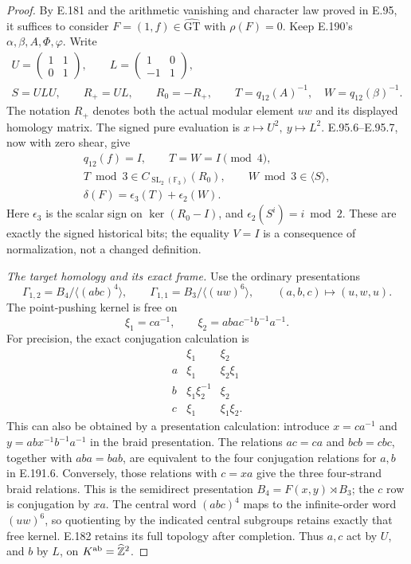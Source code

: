 \begin{proof}
By E.181 and the arithmetic vanishing and character
law proved in E.95, it suffices to consider
\(F=(1,f)\in\widehat{\mathrm{GT}}\) with \(\rho(F)=0\).
Keep E.190's \(\alpha,\beta,A,\Phi,\varphi\).  Write
\[
 \begin{gathered}
 U=\begin{pmatrix}1&1\\0&1\end{pmatrix},\qquad
 L=\begin{pmatrix}1&0\\-1&1\end{pmatrix},\\
 S=ULU,\qquad R_+=UL,\qquad R_0=-R_+,\qquad
 T=q_{12}(A)^{-1},\quad W=q_{12}(\beta)^{-1}.
 \end{gathered}
\tag{E.191.2}
\]
The notation \(R_+\) denotes both the actual modular
element \(uw\) and its displayed homology matrix.
The signed pure evaluation is
\(x\mapsto U^2,\ y\mapsto L^2\).
E.95.6--E.95.7, now with zero shear, give
\[
 \begin{gathered}
 q_{12}(f)=I,\qquad T=W=I\pmod4,\\
 T\bmod3\in C_{\operatorname{SL}_2(\mathbb F_3)}(R_0),
 \qquad W\bmod3\in\langle S\rangle,\\
 \delta(F)=\epsilon_3(T)+\epsilon_2(W).
 \end{gathered}
\tag{E.191.3}
\]
Here \(\epsilon_3\) is the scalar sign on
\(\ker(R_0-I)\), and \(\epsilon_2(S^i)=i\bmod2\).
These are exactly the signed historical bits;
the equality \(V=I\) is a consequence of normalization,
not a changed definition.

\emph{The target homology and its exact frame.}
Use the ordinary presentations
\[
 \Gamma_{1,2}=B_4/\langle(abc)^4\rangle,\qquad
 \Gamma_{1,1}=B_3/\langle(uw)^6\rangle,
 \qquad(a,b,c)\longmapsto(u,w,u).
\tag{E.191.4}
\]
The point-pushing kernel is free on
\[
       \xi_1=ca^{-1},\qquad
       \xi_2=aba c^{-1}b^{-1}a^{-1}.
\tag{E.191.5}
\]
For precision, the exact conjugation calculation is
\[
 \begin{array}{c|cc}
       &\xi_1&\xi_2\\ \hline
 a&\xi_1&\xi_2\xi_1\\
 b&\xi_1\xi_2^{-1}&\xi_2\\
 c&\xi_1&\xi_1\xi_2 .
 \end{array}
\tag{E.191.6}
\]
This can also be obtained by a presentation
calculation: introduce \(x=ca^{-1}\) and
\(y=abx^{-1}b^{-1}a^{-1}\) in the braid
presentation.  The relations \(ac=ca\) and
\(bcb=cbc\), together with \(aba=bab\), are
equivalent to the four conjugation relations
for \(a,b\) in E.191.6.  Conversely, those
relations with \(c=xa\) give the three
four-strand braid relations.  This is the
semidirect presentation \(B_4=F(x,y)\rtimes B_3\);
the \(c\) row is conjugation by \(xa\).
The central word \((abc)^4\) maps to the
infinite-order word \((uw)^6\), so quotienting
by the indicated central subgroups retains
exactly that free kernel.  E.182 retains its
full topology after completion.
Thus \(a,c\) act by \(U\), and \(b\) by \(L\),
on \(K^{\rm ab}=\widehat{\mathbb Z}^2\).


\end{proof}
